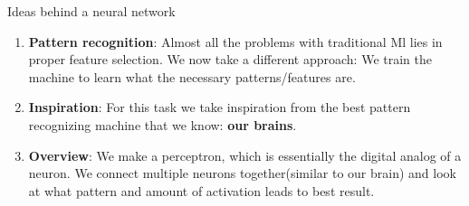
  \begin{frame}
  \end{frame}

  \usebackgroundtemplate{ }

\begin{frame}{Ideas behind a neural network}
\begin{enumerate}[$\bullet$]
	\item \textbf{Pattern recognition}: Almost all the problems with traditional Ml lies in proper feature selection. We now take a different approach: We train the machine to learn what the necessary patterns/features are.\pause
	\item \textbf{Inspiration}: For this task we take inspiration from the best pattern recognizing machine that we know:\pause\textbf{ our brains}.\pause
	\item \textbf{Overview}: We make a perceptron, which is essentially the digital analog of a neuron. We connect multiple neurons together(similar to our brain) and look at what pattern and amount of activation leads to best result.
\end{enumerate}
\end{frame}



